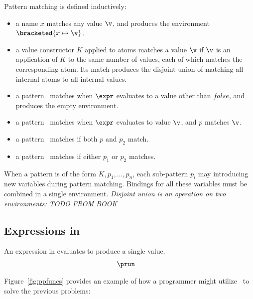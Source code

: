 \documentclass[manuscript,screen,review, 12pt, nonacm]{acmart}
\begin{document}
Pattern matching is defined inductively: 
\begin{itemize}
    \item a name $x$ matches any value $\v$, and produces the environment 
    $\bracketed{x \mapsto \v}$. 
    \item a value constructor $K$ applied to atoms  matches 
    a value $\v$ if $\v$ is an application of $K$ to the same number of values,
    each of which matches the corresponding atom. Its match produces 
    the disjoint union of matching all internal atoms to all internal values. 
    \item a pattern \whenexpr\ matches when $\expr$ evaluates to a value other than 
    $\mathit{false}$, and produces the empty environment. 
    \item a pattern \parrowe\ matches when $\expr$ evaluates to 
          value $\v$, and $p$ matches $\v$. 
    \item a pattern \pcommap\ matches if both $p$ and $p_{2}$ match.
    \item a pattern \porp\ matches if either $p_{1}$ or $p_{2}$
    matches. 
\end{itemize}

When a pattern is of the form $K, p_{1}, \dots, p_{n}$, each sub-pattern
$p_{i}$ may introducing new variables during pattern matching. Bindings for
all these variables must be combined in a single environment. \it{Disjoint
union} is an operation on two environments:
TODO FROM BOOK 



\subsection{Expressions in \PPlus}

    An expression in {\PPlus} evaluates to produce a single value. 
    \begin{align*}
        &\prun
    \end{align*}
    
    \ppsemantics 
      
      \bigskip 

    
    Figure~\ref{fig:ppfuncs} provides an example of how a programmer might utilize
    \PPlus\ to solve the previous problems: 
\end{document}
